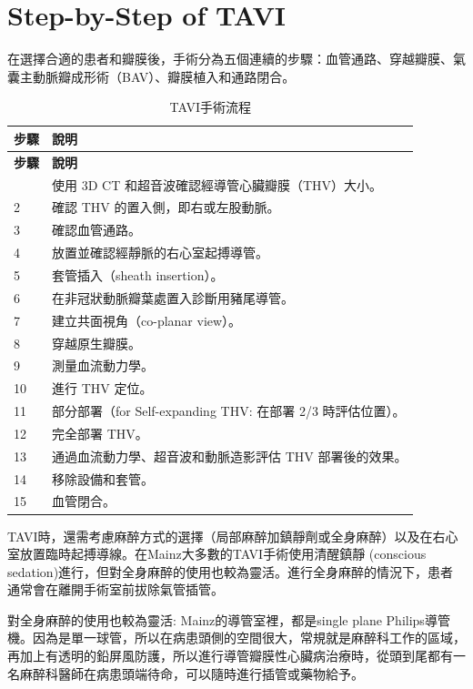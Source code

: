 \documentclass[nols]{tufte-book}
\begin{document}
\section{Step-by-Step of TAVI}
在選擇合適的患者和瓣膜後，手術分為五個連續的步驟：血管通路、穿越瓣膜、氣囊主動脈瓣成形術（BAV）、瓣膜植入和通路閉合。


\begin{longtable}{p{1cm} p{9cm}}
\caption{TAVI手術流程}
\hline
\textbf{步驟} & \textbf{說明} \\ \hline
\endfirsthead
\hline
\textbf{步驟} & \textbf{說明} \\ \hline
\endhead
\hline
\endfoot
1 & 使用 3D CT 和超音波確認經導管心臟瓣膜（THV）大小。 \\ \hline
2 & 確認 THV 的置入側，即右或左股動脈。 \\ \hline
3 & 確認血管通路。 \\ \hline
4 & 放置並確認經靜脈的右心室起搏導管。 \\ \hline
5 & 套管插入（sheath insertion）。 \\ \hline
6 & 在非冠狀動脈瓣葉處置入診斷用豬尾導管。 \\ \hline
7 & 建立共面視角（co-planar view）。 \\ \hline
8 & 穿越原生瓣膜。 \\ \hline
9 & 測量血流動力學。 \\ \hline
10 & 進行 THV 定位。 \\ \hline
11 & 部分部署（for Self-expanding THV: 在部署 2/3 時評估位置）。 \\ \hline
12 & 完全部署 THV。 \\ \hline
13 & 通過血流動力學、超音波和動脈造影評估 THV 部署後的效果。 \\ \hline
14 & 移除設備和套管。 \\ \hline
15 & 血管閉合。 \\ \hline
\end{longtable}

TAVI時，還需考慮麻醉方式的選擇（局部麻醉加鎮靜劑或全身麻醉）以及在右心室放置臨時起搏導線。在Mainz大多數的TAVI手術使用清醒鎮靜 (conscious sedation)進行，但對全身麻醉的使用也較為靈活。進行全身麻醉的情況下，患者通常會在離開手術室前拔除氣管插管。

對全身麻醉的使用也較為靈活: Mainz的導管室裡，都是single plane Philips導管機。因為是單一球管，所以在病患頭側的空間很大，常規就是麻醉科工作的區域，再加上有透明的鉛屏風防護，所以進行導管瓣膜性心臟病治療時，從頭到尾都有一名麻醉科醫師在病患頭端待命，可以隨時進行插管或藥物給予。
\end{document}
